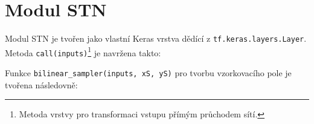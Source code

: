\section{Modul STN}
\label{sec:Chapter56}
Modul STN je tvořen jako vlastní Keras vrstva dědící z \texttt{tf.keras.layers.Layer}. Metoda \texttt{call(inputs)}\footnote{Metoda vrstvy pro transformaci vstupu přímým průchodem sítí.} je navržena takto:

\label{src:stn_call}


Funkce \texttt{bilinear\_sampler(inputs, xS, yS)} pro tvorbu vzorkovacího pole je tvořena následovně:

\label{src:stn_grid_gen}


\endinput